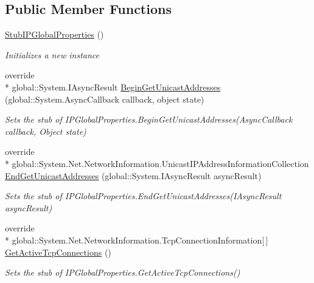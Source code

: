 \subsection*{Public Member Functions}
\begin{DoxyCompactItemize}
\item 
\hyperlink{class_system_1_1_net_1_1_network_information_1_1_fakes_1_1_stub_i_p_global_properties_a8571ca3b1a12f7a6eed496aff93ba9fa}{Stub\-I\-P\-Global\-Properties} ()
\begin{DoxyCompactList}\small\item\em Initializes a new instance\end{DoxyCompactList}\item 
override \\*
global\-::\-System.\-I\-Async\-Result \hyperlink{class_system_1_1_net_1_1_network_information_1_1_fakes_1_1_stub_i_p_global_properties_a84ea70a7e1066bdb1b4ae66d0ebf63fa}{Begin\-Get\-Unicast\-Addresses} (global\-::\-System.\-Async\-Callback callback, object state)
\begin{DoxyCompactList}\small\item\em Sets the stub of I\-P\-Global\-Properties.\-Begin\-Get\-Unicast\-Addresses(\-Async\-Callback callback, Object state)\end{DoxyCompactList}\item 
override \\*
global\-::\-System.\-Net.\-Network\-Information.\-Unicast\-I\-P\-Address\-Information\-Collection \hyperlink{class_system_1_1_net_1_1_network_information_1_1_fakes_1_1_stub_i_p_global_properties_a0766f2e3f333f72b7fc2cebbbd9ca410}{End\-Get\-Unicast\-Addresses} (global\-::\-System.\-I\-Async\-Result async\-Result)
\begin{DoxyCompactList}\small\item\em Sets the stub of I\-P\-Global\-Properties.\-End\-Get\-Unicast\-Addresses(\-I\-Async\-Result async\-Result)\end{DoxyCompactList}\item 
override \\*
global\-::\-System.\-Net.\-Network\-Information.\-Tcp\-Connection\-Information\mbox{[}$\,$\mbox{]} \hyperlink{class_system_1_1_net_1_1_network_information_1_1_fakes_1_1_stub_i_p_global_properties_ae17c3c762891a3fddc0c2c81942c751a}{Get\-Active\-Tcp\-Connections} ()
\begin{DoxyCompactList}\small\item\em Sets the stub of I\-P\-Global\-Properties.\-Get\-Active\-Tcp\-Connections()\end{DoxyCompactList}\item 

\end{DoxyCompactItemize}
